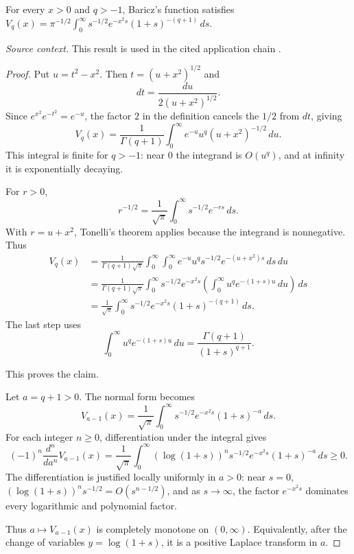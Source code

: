 \begin{proposition}
\label{res:baricz-vq-q-laplace-normal-form}
For every \(x>0\) and \(q>-1\), Baricz's function satisfies \(V_q(x)=\pi^{-1/2}\int_0^\infty s^{-1/2}e^{-x^2s}(1+s)^{-(q+1)}\,ds\).

\emph{Source context.} This result is used in the cited application chain \cite{app-app-0004-source,baricz-turan-thesis}.
\end{proposition}
\begin{proof}
Put \(u=t^2-x^2\). Then \(t=(u+x^2)^{1/2}\) and
\[
dt=\frac{du}{2(u+x^2)^{1/2}}.
\]
Since \(e^{x^2}e^{-t^2}=e^{-u}\), the factor \(2\) in the definition cancels the \(1/2\) from \(dt\), giving
\[
V_q(x)=\frac1{\Gamma(q+1)}
\int_0^\infty e^{-u}u^q(u+x^2)^{-1/2}\,du.
\]
This integral is finite for \(q>-1\): near \(0\) the integrand is \(O(u^q)\), and at infinity it is exponentially decaying.

For \(r>0\),
\[
r^{-1/2}=\frac1{\sqrt\pi}\int_0^\infty s^{-1/2}e^{-rs}\,ds.
\]
With \(r=u+x^2\), Tonelli's theorem applies because the integrand is nonnegative. Thus
\[
\begin{aligned}
V_q(x)
&=\frac1{\Gamma(q+1)\sqrt\pi}
\int_0^\infty\int_0^\infty
e^{-u}u^q s^{-1/2}e^{-(u+x^2)s}\,ds\,du\\
&=\frac1{\Gamma(q+1)\sqrt\pi}
\int_0^\infty s^{-1/2}e^{-x^2s}
\left(\int_0^\infty u^q e^{-(1+s)u}\,du\right)\,ds\\
&=\frac1{\sqrt\pi}\int_0^\infty
s^{-1/2}e^{-x^2s}(1+s)^{-(q+1)}\,ds.
\end{aligned}
\]
The last step uses
\[
\int_0^\infty u^q e^{-(1+s)u}\,du
=\frac{\Gamma(q+1)}{(1+s)^{q+1}}.
\]

This proves the claim.

Let \(a=q+1>0\). The normal form becomes
\[
V_{a-1}(x)=\frac1{\sqrt\pi}\int_0^\infty
s^{-1/2}e^{-x^2s}(1+s)^{-a}\,ds.
\]
For each integer \(n\ge0\), differentiation under the integral gives
\[
(-1)^n\frac{d^n}{da^n}V_{a-1}(x)
=\frac1{\sqrt\pi}\int_0^\infty
(\log(1+s))^n s^{-1/2}e^{-x^2s}(1+s)^{-a}\,ds\ge0.
\]
The differentiation is justified locally uniformly in \(a>0\): near \(s=0\), \((\log(1+s))^n s^{-1/2}=O(s^{n-1/2})\), and as \(s\to\infty\), the factor \(e^{-x^2s}\) dominates every logarithmic and polynomial factor.

Thus \(a\mapsto V_{a-1}(x)\) is completely monotone on \((0,\infty)\). Equivalently, after the change of variables \(y=\log(1+s)\), it is a positive Laplace transform in \(a\).


\end{proof}
